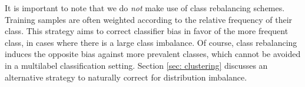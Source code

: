 It is important to note that we do \textit{not} make use of class rebalancing schemes. Training samples are often 
weighted according to the relative frequency of their class. This strategy aims to correct classifier bias in favor of 
the more frequent class, in cases where there is a large class imbalance. Of course, class rebalancing induces the 
opposite bias against more prevalent classes, which cannot be avoided in a multilabel classification setting. 
Section \ref{sec: clustering} discusses an alternative strategy to naturally correct for distribution imbalance.
